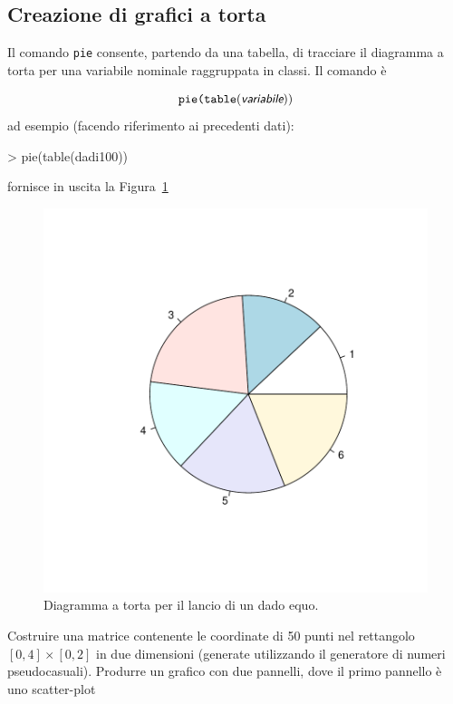 \documentclass[onecolumn,12pt]{book}
\newcommand{\varia}[1]{\textsl{\textsf{#1}}}
\begin{document}
\subsection{Creazione di grafici a torta}

Il comando \texttt{pie} consente, partendo da una tabella, di tracciare il diagramma a torta per una variabile nominale raggruppata in classi. Il comando \`e

\begin{equation*}\texttt{pie(table}(\varia{variabile} ))
\end{equation*}
ad esempio (facendo riferimento ai precedenti dati):
\begin{Schunk}
\begin{Sinput}
> pie(table(dadi100))
\end{Sinput}
\end{Schunk}
fornisce in uscita  la Figura~\ref{fig:pie}
\begin{figure}[htbp]
\begin{center}
\includegraphics{RbookParte2-043}
\caption{Diagramma a torta per il lancio di un dado equo.}
\label{fig:pie}
\end{center}
\end{figure}
\begin{shaded}{Costruire una matrice contenente le coordinate di 50 punti nel rettangolo $[0,4]\times [0,2]$ in due dimensioni (generate utilizzando il generatore di numeri pseudocasuali). Produrre un grafico con due pannelli, dove il primo pannello \`e uno scatter-plot}
\end{shaded}
\end{document}
